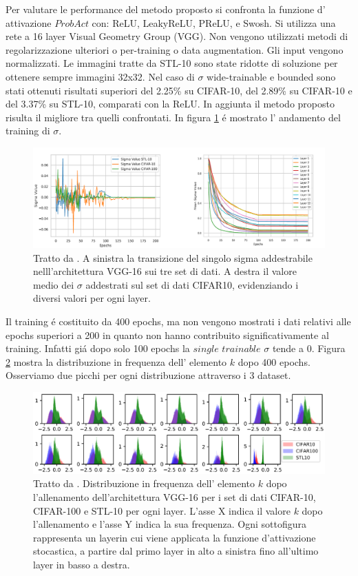 \documentclass[a4paper,12pt]{report}
\begin{document}
  Per valutare le performance del metodo proposto si confronta la funzione d' attivazione $ProbAct$ con: ReLU, LeakyReLU, PReLU, e Swosh\cite{ramachandran2017searching}. Si utilizza una rete a 16 layer Visual Geometry Group (VGG). Non vengono utilizzati metodi di regolarizzazione ulteriori o per-training o data augmentation. Gli input vengono normalizzati. Le immagini tratte da STL-10 sono state ridotte di soluzione per ottenere sempre immagini 32x32.
  Nel caso di $\sigma$ wide-trainable e bounded sono stati ottenuti risultati superiori del 2.25\% su CIFAR-10, del 2.89\% su CIFAR-10 e del 3.37\% su STL-10, comparati con la ReLU. In aggiunta il metodo proposto risulta il migliore tra quelli confrontati.
  In figura \ref{SigmaTrainingpng} \'e mostrato l' andamento del training di $\sigma$. 
  \begin{figure}[h!]
   \centering
   \includegraphics[width=\linewidth]{SigmaTraining.png} 
   \caption{Tratto da \cite{lee2019probact}. A sinistra la transizione del singolo sigma addestrabile nelll'architettura VGG-16 sui tre set di dati. A destra il valore medio dei $\sigma$ addestrati sul set di dati CIFAR10, evidenziando i diversi valori per ogni layer.}
  \label{SigmaTrainingpng}
  \end{figure}

  
  Il training \'e costituito da 400 epochs, ma non vengono mostrati i dati relativi alle epochs superiori a 200 in quanto non hanno contribuito significativamente al training. Infatti gi\'a dopo solo 100 epochs la $single$ $trainable$ $\sigma$ tende a 0. 
  Figura \ref{kFreqDistrpng} mostra la distribuzione in frequenza dell' elemento $k$ dopo 400 epochs. Osserviamo due picchi per ogni distribuzione attraverso i 3 dataset.  
  \begin{figure}[h!]
   \centering
   \includegraphics[width=\linewidth]{kFreqDistr.png} 
   \caption{Tratto da \cite{lee2019probact}. Distribuzione in frequenza dell' elemento $k$ dopo l'allenamento dell'architettura VGG-16 per i set di dati CIFAR-10, CIFAR-100 e STL-10 per ogni layer. L'asse X indica il valore $k$ dopo l'allenamento e l'asse Y indica la sua frequenza. Ogni sottofigura rappresenta un layerin cui viene applicata la funzione d'attivazione stocastica, a partire dal primo layer in alto a sinistra fino all'ultimo layer in basso a destra.}
  \label{kFreqDistrpng}
  \end{figure}
  
\end{document}
